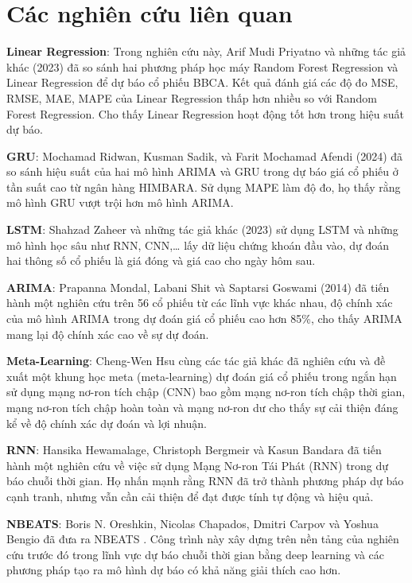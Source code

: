 \section{Các nghiên cứu liên quan}
\textbf{Linear Regression}: Trong nghiên cứu này, Arif Mudi Priyatno và những tác giả khác \cite{b1} (2023) đã so sánh hai phương pháp học máy Random Forest Regression và Linear Regression để dự báo cổ phiếu BBCA. Kết quả đánh giá các độ đo MSE, RMSE, MAE, MAPE của Linear Regression thấp hơn nhiều so với Random Forest Regression. Cho thấy Linear Regression hoạt động tốt hơn trong hiệu suất dự báo.
\par
\textbf{GRU}: Mochamad Ridwan, Kusman Sadik, và Farit Mochamad Afendi \cite{b2} (2024) đã so sánh hiệu suất của hai mô hình ARIMA và GRU trong dự báo giá cổ phiếu ở tần suất cao từ ngân hàng HIMBARA. Sử dụng MAPE làm độ đo, họ thấy rằng mô hình GRU vượt trội hơn mô hình ARIMA.
\par
\textbf{LSTM}: Shahzad Zaheer và những tác giả khác \cite{b3} (2023) sử dụng LSTM và những mô hình học sâu như RNN, CNN,… lấy dữ liệu chứng khoán đầu vào, dự đoán hai thông số cổ phiếu là giá đóng và giá cao cho ngày hôm sau.
\par
\textbf{ARIMA}: Prapanna Mondal, Labani Shit và Saptarsi Goswami \cite{b4} (2014) đã tiến hành một nghiên cứu trên 56 cổ phiếu từ các lĩnh vực khác nhau, độ chính xác của mô hình ARIMA trong dự đoán giá cổ phiếu cao hơn 85\%, cho thấy ARIMA mang lại độ chính xác cao về sự dự đoán.
\par
\textbf{Meta-Learning}: Cheng-Wen Hsu cùng các tác giả khác \cite{b5} đã nghiên cứu và đề xuất một khung học meta (meta-learning) dự đoán giá cổ phiếu trong ngắn hạn sử dụng mạng nơ-ron tích chập (CNN) bao gồm mạng nơ-ron tích chập thời gian, mạng nơ-ron tích chập hoàn toàn và mạng nơ-ron dư cho thấy sự cải thiện đáng kể về độ chính xác dự đoán và lợi nhuận.
\par
\textbf{RNN}: 
Hansika Hewamalage, Christoph Bergmeir và Kasun Bandara đã tiến hành một nghiên cứu về việc sử dụng Mạng Nơ-ron Tái Phát (RNN) \cite{b6} trong dự báo chuỗi thời gian. Họ nhấn mạnh rằng RNN đã trở thành phương pháp dự báo cạnh tranh, nhưng vẫn cần cải thiện để đạt được tính tự động và hiệu quả. 
\par
\textbf{NBEATS}: Boris N. Oreshkin, Nicolas Chapados, Dmitri Carpov và Yoshua Bengio đã đưa ra NBEATS \cite{b7}. Công trình này xây dựng trên nền tảng của nghiên cứu trước đó trong lĩnh vực dự báo chuỗi thời gian bằng deep learning và các phương pháp tạo ra mô hình dự báo có khả năng giải thích cao hơn. %
